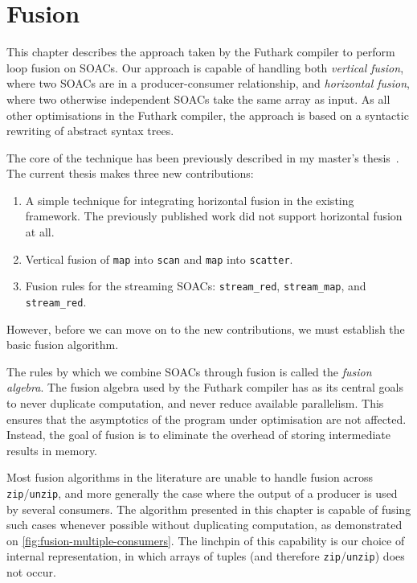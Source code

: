 \chapter{Fusion}
\label{chap:fusion}

This chapter describes the approach taken by the Futhark compiler to
perform loop fusion on SOACs.  Our approach is capable of handling
both \textit{vertical fusion}, where two SOACs are in a
producer-consumer relationship, and \textit{horizontal fusion}, where
two otherwise independent SOACs take the same array as input.  As all
other optimisations in the Futhark compiler, the approach is based on
a syntactic rewriting of abstract syntax trees.

The core of the technique has been previously described in my master's
thesis~\cite{henriksen2014exploiting}.  The current thesis makes three
new contributions:

\begin{enumerate}
\item A simple technique for integrating horizontal fusion in the
  existing framework.  The previously published work did not support
  horizontal fusion at all.
\item Vertical fusion of \lstinline{map} into \lstinline{scan} and
  \lstinline{map} into \lstinline{scatter}.
\item Fusion rules for the streaming SOACs: \lstinline{stream_red},
  \lstinline{stream_map}, and \lstinline{stream_red}.
\end{enumerate}

However, before we can move on to the new contributions, we must
establish the basic fusion algorithm.

The rules by which we combine SOACs through fusion is called the
\textit{fusion algebra}.  The fusion algebra used by the Futhark
compiler has as its central goals to never duplicate computation, and
never reduce available parallelism.  This ensures that the asymptotics
of the program under optimisation are not affected.  Instead, the goal
of fusion is to eliminate the overhead of storing intermediate results
in memory.

Most fusion algorithms in the literature are unable to handle fusion
across \lstinline{zip}/\lstinline{unzip}, and more generally the case
where the output of a producer is used by several consumers.  The
algorithm presented in this chapter is capable of fusing such cases
whenever possible without duplicating computation, as demonstrated on
\cref{fig:fusion-multiple-consumers}.  The linchpin of this capability
is our choice of internal representation, in which arrays of tuples
(and therefore \lstinline{zip}/\lstinline{unzip}) does not occur.

